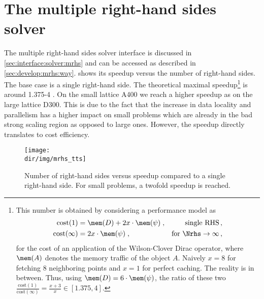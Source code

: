 \section{The multiple right-hand sides solver}
\label{sec:perf:solver:mrhs}

The multiple right-hand sides solver interface is discussed in \cref{sec:interface:solver:mrhs} and can be accessed as described in \cref{sec:develop:mrhs:way}.
 shows its speedup versus the number of right-hand sides. %
The base case is a single right-hand side.
The theoretical maximal speedup\footnote{
This number is obtained by considering a performance model as
\begin{align}
\text{cost}(1)      &= \mem(D) + 2 x \cdot \mem(\psi) \;,    &\text{single RHS} \,, \\
\text{cost}(\infty) &= 2 x \cdot \mem(\psi) \;,              &\text{for } \Nrhs \to \infty  \,,
\end{align}
for the cost of an application of the Wilson-Clover Dirac operator, where $\mem(A)$ denotes the memory traffic of the object $A$.
Naively $x=8$ for fetching \num{8} neighboring points and $x=1$ for perfect caching.
The reality is in between.
Thus, using $\mem(D) = 6 \cdot \mem(\psi)$, the ratio of these two $\frac{\text{cost}(1)}{\text{cost}(\infty)} = \frac{x+3}{x} \in \left[ 1.375, 4 \right]$.
} is around 1.375-4 .
On the small lattice A400 we reach a higher speedup as on the large lattice D300.
This is due to the fact that the increase in data locality and parallelism has a higher impact on small problems which are already in the bad strong scaling region as opposed to large ones.
However, the speedup directly translates to cost efficiency.
\begin{figure}
    \centering
    \texttt{[image: \\dir/img/mrhs\_tts]}
    \caption{Number of right-hand sides versus speedup compared to a single right-hand side. For small problems, a twofold speedup is reached. }
    \label{fig:mrhs:tts}
\end{figure}

